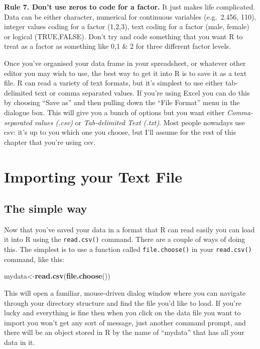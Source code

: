 \documentclass[
]{book}
\newenvironment{Shaded}{\begin{snugshade}}{\end{snugshade}}
\newcommand{\KeywordTok}[1]{\textcolor[rgb]{0.13,0.29,0.53}{\textbf{#1}}}
\newcommand{\NormalTok}[1]{#1}
\begin{document}
\textbf{Rule 7. Don't use zeros to code for a factor.} It just makes life complicated. Data can be either character, numerical for continuous variables (e.g.~2.456, 110), integer values coding for a factor (1,2,3), text coding for a factor (male, female) or logical (TRUE,FALSE). Don't try and code something that you want R to treat as a factor as something like 0,1 \& 2 for three different factor levels.

Once you've organised your data frame in your spreadsheet, or whatever other editor you may wish to use, the best way to get it into R is to save it as a text file. R can read a variety of text formats, but it's simplest to use either tab-delimited text or comma separated values. If you're using Excel you can do this by choosing ``Save as'' and then pulling down the ``File Format'' menu in the dialogue box. This will give you a bunch of options but you want either \emph{Comma-separated values (.csv)} or \emph{Tab-delimited Text (.txt)}. Most people nowadays use csv: it's up to you which one you choose, but I'll assume for the rest of this chapter that you're using csv.

\hypertarget{importing-your-text-file}{%
\section{Importing your Text File}\label{importing-your-text-file}}

\hypertarget{the-simple-way}{%
\subsection{The simple way}\label{the-simple-way}}

Now that you've saved your data in a format that R can read easily you can load it into R using the \texttt{read.csv()} command. There are a couple of ways of doing this. The simplest is to use a function called \texttt{file.choose()} in your \texttt{read.csv()} command, like this:

\begin{Shaded}
\begin{Highlighting}[]
\NormalTok{mydata<-}\KeywordTok{read.csv}\NormalTok{(}\KeywordTok{file.choose}\NormalTok{())}
\end{Highlighting}
\end{Shaded}

This will open a familiar, mouse-driven dialog window where you can navigate through your directory structure and find the file you'd like to load. If you're lucky and everything is fine then when you click on the data file you want to import you won't get any sort of message, just another command prompt, and there will be an object stored in R by the name of ``mydata'' that has all your data in it.
\end{document}
